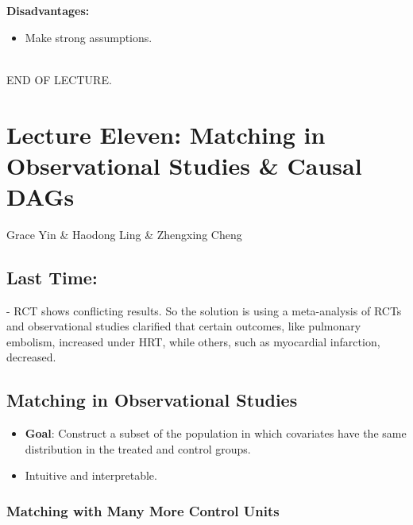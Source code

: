 \textbf{Disadvantages:}
\begin{itemize}
    \item Make strong assumptions.
\end{itemize}

\\

END OF LECTURE.



\section{Lecture Eleven: Matching in Observational Studies \& Causal DAGs}{Grace Yin \& Haodong Ling \& Zhengxing Cheng}

\subsection{Last Time:}
- RCT shows conflicting results. So the solution is using a meta-analysis of RCTs and observational studies clarified that certain outcomes, like pulmonary embolism, increased under HRT, while others, such as myocardial infarction, decreased.


\subsection{Matching in Observational Studies}
\begin{itemize}
    \item \textbf{Goal}: Construct a subset of the population in which covariates have the same distribution in the treated and control groups.
    \item Intuitive and interpretable.
\end{itemize}

\subsubsection{Matching with Many More Control Units}

